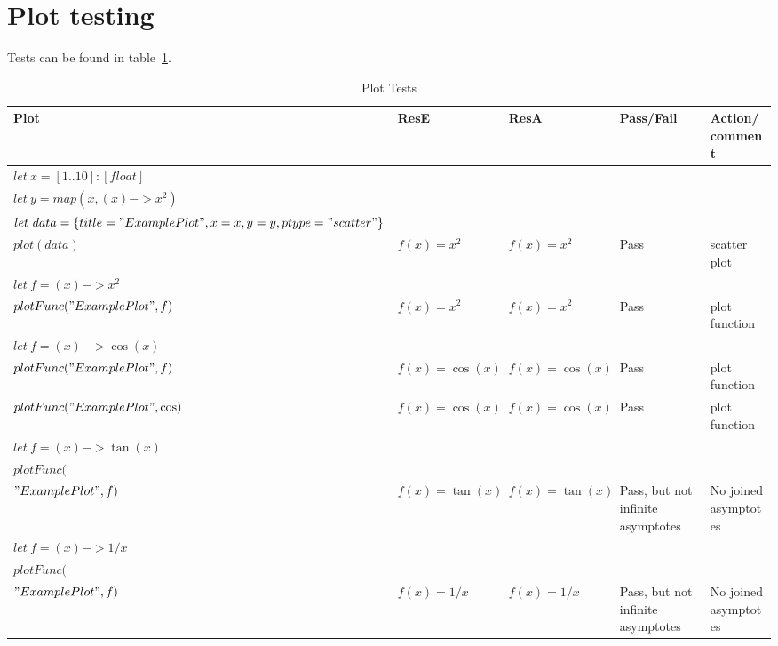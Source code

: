 \section{Plot testing}\label{sec:plot-testing}

Tests can be found in table~\ref{tab:plot-tests}.

\begin{table}[h]
    \caption{Plot Tests}
\begin{tabular}{|p{1.8in}|p{0.5in}|p{0.4in}|p{0.6in}|p{1.4in}|} \hline
Plot & ResE & ResA& Pass/Fail & Action/comment \\ \hline \hline
$let\ x = [1..10] : [float]$ & & & & \\
$let\ y = map(x, (x) -> x^2)$ & & & & \\
$let\ data = \{ title = "Example Plot", x = x, y = y, ptype = "scatter" \}$ & & & & \\
$plot(data)$ & $f(x) = x^2$ & $f(x) = x^2$ & Pass & scatter plot \\ \hline
$let\ f = (x) -> x^2$ & & & & \\
$plotFunc("Example Plot", f)$ & $f(x) = x^2$ & $f(x) = x^2$ & Pass & plot function \\ \hline
$let\ f = (x) -> \cos(x)$ & & & & \\
$plotFunc("Example Plot", f)$ & $f(x) = \cos(x)$ & $f(x) = \cos(x)$ & Pass & plot function \\ \hline
$plotFunc("Example Plot", \cos)$ & $f(x) = \cos(x)$ & $f(x) = \cos(x)$ & Pass & plot function \\ \hline
$let\ f = (x) -> \tan(x)$ & & & & \\
$plotFunc($ & & & & \\
$"Example Plot", f)$ & $f(x) = \tan(x)$ & $f(x) = \tan(x)$ & Pass, but not infinite asymptotes & No joined asymptotes \\ \hline
$let\ f = (x) -> 1 / x$ & & & & \\
$plotFunc($ & & & & \\
$"Example Plot", f)$ & $f(x) = 1/x$ & $f(x) = 1/x$ & Pass, but not infinite asymptotes & No joined asymptotes \\ \hline
\end{tabular}
\label{tab:plot-tests}
\end{table}
